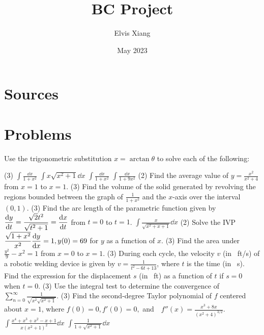 \documentclass{article}
\title{BC Project}
\author{Elvis Xiang}
\date{May 2023}
\newcommand{\indisp}[1]{\(\displaystyle #1\)}
\begin{document}
	\maketitle
	\section{Sources}
	\newpage
	\section{Problems}
		Use the trigonometric substitution \(x = \arctan\theta\) to solve each of the following:
		\begin{tasks}[style = enumerate](3)
			\task
				\indisp{\int \frac{\dd{x}}{1 + x^2}}
			\task
				\indisp{\int x\sqrt{x^2 + 1} \dd{x}}
			\task
				\indisp{\int \frac{\dd{x}}{1 + x^2}}
			\task
				\indisp{\int \frac{\dd{x}}{1 + 9x^2}}
			\task*(2)
				Find the average value of \indisp{y = \frac{x^2}{x^2 + 4}} from \(x = 1\) to \(x = 1\).
			\task*(3)
				Find the volume of the solid generated by revolving the regions bounded between the graph of \indisp{\frac{1}{1 + x^2}} and the \(x\)-axis over the interval \((0, 1)\).
			\task*(3)
				Find the arc length of the parametric function given by \indisp{\dv{y}{t} =  \frac{\sqrt{2}t^2}{\sqrt{t^2 + 1}} = \dv{x}{t}} from \(t = 0\) to \(t = 1\).
			\task
				\indisp{\int \frac{x}{\sqrt{x^2 + x + 1}} \dd{x}}
			\task*(2)
				Solve the IVP \indisp{\frac{\sqrt{1 + x^2}}{x^2}\dv{y}{x} = 1, y(0) = 69} for \(y\) as a function of \(x\).
			\task*(3)
				Find the area under \indisp{\frac{y^2}{9} - x^2 = 1} from \(x = 0\) to \(x = 1\).
			\task*(3)
				During each cycle, the velocity \(v\) (in \SI{}{ft/s}) of a robotic welding device is given by \indisp{v = \frac{1}{t^2 - 6t + 13}}, where \(t\) is the time (in \SI{}{s}). Find the expression for the displacement \(s\) (in \SI{}{ft}) as a function of \(t\) if \(s = 0\) when \(t = 0\).
			\task*(3)
				Use the integral test to determine the convergence of \indisp{\sum_{n = 0}^\infty \frac{1}{\sqrt{x^2\sqrt{x^2 + 1}}}}.
			\task*(3)
				Find the second-degree Taylor polynomial of \(f\) centered about \(x = 1\), where \(f(0) = 0, f'(0) = 0,\) and\,\,\,\, \indisp{f''(x) = \frac{x^3 + 8x}{(x^2 + 4)^{3/2}}}.
			\task
				\indisp{\int \frac{x^4 + x^3 + x^2 - x + 1}{x(x^2 + 1)^2} \dd{x}}
			\task
				\indisp{\int \frac{1}{1 + \sqrt{x^2 + 1}} \dd{x}}
		\end{tasks}
	\newpage
\end{document}
